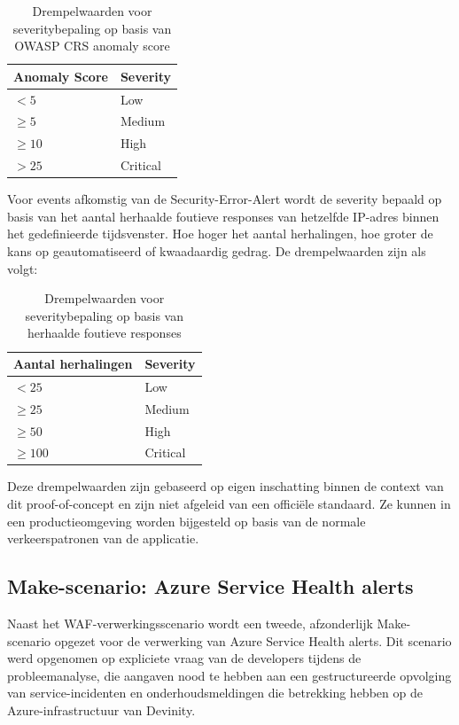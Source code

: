 \begin{table}[H]
    \centering
    \begin{tabular}{ll}
        \hline
        \textbf{Anomaly Score} & \textbf{Severity} \\
        \hline
        $< 5$ & Low \\
        $\geq 5$ & Medium \\
        $\geq 10$ & High \\
        $> 25$ & Critical \\
        \hline
    \end{tabular}
    \caption{Drempelwaarden voor severitybepaling op basis van OWASP CRS anomaly score}
\end{table}

Voor events afkomstig van de Security-Error-Alert wordt de severity bepaald op basis van het aantal herhaalde foutieve responses van hetzelfde IP-adres binnen het gedefinieerde tijdsvenster. Hoe hoger het aantal herhalingen, hoe groter de kans op geautomatiseerd of kwaadaardig gedrag. De drempelwaarden zijn als volgt:

\begin{table}[H]
    \centering
    \begin{tabular}{ll}
        \hline
        \textbf{Aantal herhalingen} & \textbf{Severity} \\
        \hline
        $< 25$ & Low \\
        $\geq 25$ & Medium \\
        $\geq 50$ & High \\
        $\geq 100$ & Critical \\
        \hline
    \end{tabular}
    \caption{Drempelwaarden voor severitybepaling op basis van herhaalde foutieve responses}
\end{table}

Deze drempelwaarden zijn gebaseerd op eigen inschatting binnen de context van dit proof-of-concept en zijn niet afgeleid van een officiële standaard. Ze kunnen in een productieomgeving worden bijgesteld op basis van de normale verkeerspatronen van de applicatie.

\subsection{Make-scenario: Azure Service Health alerts}

Naast het WAF-verwerkingsscenario wordt een tweede, afzonderlijk Make-scenario opgezet voor de verwerking van Azure Service Health alerts. Dit scenario werd opgenomen op expliciete vraag van de developers tijdens de probleemanalyse, die aangaven nood te hebben aan een gestructureerde opvolging van service-incidenten en onderhoudsmeldingen die betrekking hebben op de Azure-infrastructuur van Devinity.

